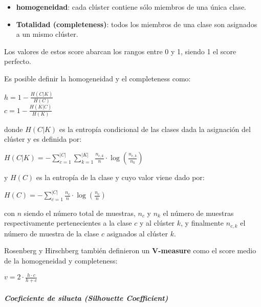 \begin{itemize}
	
	\item \textbf{homogeneidad}: cada clúster contiene sólo miembros de una única clase.
	
	\item \textbf{Totalidad (completeness)}: todos los miembros de una clase son asignados a un mismo clúster.
	
\end{itemize}

Los valores de estos score abarcan los rangos entre 0 y 1, siendo 1 el score perfecto.

Es posible definir la homogeneidad y el completeness como:

\begin{center}
	
	$h = 1 - \frac{H(C|K)}{H(C)}$\\
	$c = 1 - \frac{H(K|C)}{H(K)}$
\end{center}

donde $H(C|K)$ es la entropía condicional de las clases dada la asignación del clúster y es definida por:

\begin{center}
	
	$H(C|K) = - \sum_{c=1}^{|C|} \sum_{k=1}^{|K|} \frac{n_{c,k}}{n} \cdot \log(\frac{n_{c,k}}{n_k})$
	
\end{center}

y $H(C)$ es la entropía de la clase y cuyo valor viene dado por:

\begin{center}
	
	$H(C) = - \sum_{c=1}^{|C|} \frac{n_c}{n} \cdot \log(\frac{n_c}{n})$
\end{center}

con $n$ siendo el número total de muestras, $n_c$ y $n_k$ el número de muestras respectivamente pertenecientes a la clase $c$ y al clúster $k$, y finalmente $n_{c,k}$ el número de muestra de la clase $c$ asignados al clúster $k$.

Rosenberg y Hirschberg también definieron un \textbf{V-measure} como el score medio de la homogeneidad y completeness:

\begin{center}
	
	$v = 2 \cdot \frac{h \cdot c}{h + c}$
\end{center}
\subparagraph{Coeficiente de silueta (Silhouette Coefficient)\\\\}

